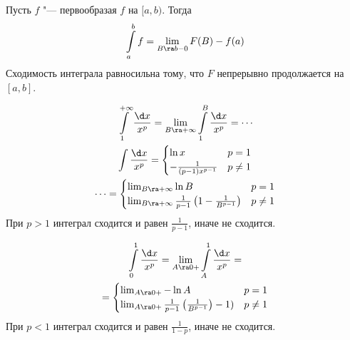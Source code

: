 \begin{Rem}
	Пусть $f$ "--- первообразая $f$ на $[a, b)$.
	Тогда
	\[ \int\limits_a^b f = \lim_{B \ra b-0} F(B) - f(a) \]
	Сходимость интеграла равносильна тому, что $F$ непрерывно продолжается на $[a, b]$.
\end{Rem}

\begin{exmp}
	\begin{gather*}
		\int\limits_1^{+\infty} \frac{\d x}{x^p} = \lim_{B \ra +\infty} \int\limits_1^B \frac{\d x}{x^p} = \cdots \\
		\int \frac{\d x}{x^p} = \begin{cases}
			\ln x & p = 1 \\
			-\frac1{(p-1)x^{p-1}} & p \ne 1
		\end{cases} \\
		\cdots = \begin{cases}
			\lim_{B \ra +\infty} \ln B & p = 1 \\
			\lim_{B \ra +\infty} \frac1{p-1}\left(1-\frac1{B^{p-1}}\right) & p \ne 1
		\end{cases}
	\end{gather*}
	При $p > 1$ интеграл сходится и равен $\frac1{p - 1}$, иначе не сходится.
\end{exmp}

\begin{exmp}
	\begin{gather*}
		\int\limits_0^1 \frac{\d x}{x^p} = \lim_{A \ra 0+} \int\limits_A^1 \frac{\d x}{x^p} = \\
		= \begin{cases}
			\lim_{A \ra 0+} -\ln A & p = 1 \\
			\lim_{A \ra 0+} \frac1{p-1}\left(\frac1{B^{p-1}}\right)-1) & p \ne 1
		\end{cases}
	\end{gather*}
	При $p < 1$ интеграл сходится и равен $\frac1{1 - p}$, иначе не сходится.
\end{exmp}

